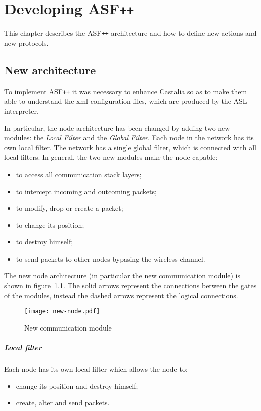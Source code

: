 
\chapter{Developing ASF\texttt{++}}
\label{chap:developing-asfpp}
This chapter describes the ASF\texttt{++} architecture and how to define new actions and new protocols.

\section{New architecture}
To implement ASF\texttt{++} it was necessary to enhance Castalia so as to make them able to understand the xml configuration files, which are produced by the ASL interpreter.

In particular, the node architecture has been changed by adding two new modules: the \emph{Local Filter} and the \emph{Global Filter}. Each node in the network has its own local filter. The network has a single global filter, which is connected with all local filters. In general, the two new modules make the node capable:
%
\begin{itemize}
\item to access all communication stack layers;
\item to intercept incoming and outcoming packets;
\item to modify, drop or create a packet;
\item to change its position;
\item to destroy himself;
\item to send packets to other nodes bypasing the wireless channel.
\end{itemize}
%
The new node architecture (in particular the new communication module) is shown in figure~\ref{fig:node-architecture}. The solid arrows represent the connections between the gates of the modules, instead the dashed arrows represent the logical connections.
%
\begin{figure}
\centering
\texttt{[image: new-node.pdf]}
\caption{New communication module}
\label{fig:node-architecture}
\end{figure}

\paragraph{Local filter}
Each node has its own local filter which allows the node to: 
%
\begin{itemize}
\item change its position and destroy himself;
\item create, alter and send packets.
\end{itemize}

